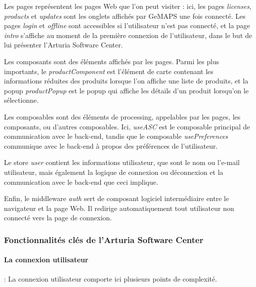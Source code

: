 \documentclass[francais]{rapportPFE}  %
\begin{document}
Les pages représentent les pages Web que l'on peut visiter : ici, les pages \textit{licenses}, \textit{products} et \textit{updates} sont les onglets affichés par GeMAPS une fois connecté. Les pages \textit{login} et \textit{offline} sont accessibles si l'utilisateur n'est pas connecté, et la page \textit{intro} s'affiche au moment de la première connexion de l'utilisateur, dans le but de lui présenter l'Arturia Software Center.

Les composants sont des éléments affichés par les pages. Parmi les plus importants, le \textit{productComponent} est l'élément de carte contenant les informations réduites des produits lorsque l'on affiche une liste de produits, et la popup \textit{productPopup} est le popup qui affiche les détails d'un produit lorsqu'on le sélectionne.

Les composables sont des éléments de processing, appelables par les pages, les composants, ou d'autres composables. Ici, \textit{useASC} est le composable principal de communication avec le back-end, tandis que le composable \textit{usePreferences} communique avec le back-end à propos des préférences de l'utilisateur.

Le store \textit{user} contient les informations utilisateur, que sont le nom ou l'e-mail utilisateur, mais également la logique de connexion ou déconnexion et la communication avec le back-end que ceci implique.

Enfin, le middleware \textit{auth} sert de composant logiciel intermédiaire entre le navigateur et la page Web. Il redirige automatiquement tout utilisateur non connecté vers la page de connexion.



\subsubsection{Fonctionnalités clés de l'Arturia Software Center}

\paragraph{La connexion utilisateur}: La connexion utilisateur comporte ici plusieurs points de complexité. 
\end{document}
